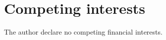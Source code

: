 \documentclass[hidelinks,letterpaper, 11pt]{article}
\begin{document}
\clearpage

\section*{Competing interests}
The author declare no competing financial interests.
\end{document}
